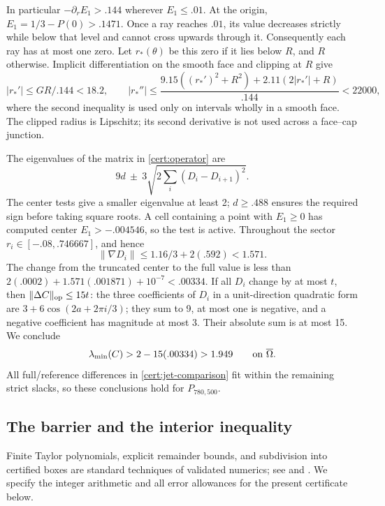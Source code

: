 \documentclass[11pt]{article}
\numberwithin{equation}{section}
\theoremstyle{definition}
\theoremstyle{remark}
\begin{document}
In particular $-\partial_rE_1>.144$ wherever $E_1\leq.01$.  At the origin,
$E_1=1/3-P(0)>.1471$.  Once a ray reaches $.01$, its value decreases
strictly while below that level and cannot cross upwards through it.
Consequently each ray has at most one zero.  Let $r_*(\theta)$ be this zero
if it lies below $R$, and $R$ otherwise.  Implicit differentiation on the
smooth face and clipping at $R$ give
\begin{equation}\label{cert:boundary-coarse}
 |r_*'|\leq GR/.144<18.2,\qquad
 |r_*''|\leq\frac{9.15((r_*')^2+R^2)+2.11(2|r_*'|+R)}{.144}<22000,
\end{equation}
where the second inequality is used only on intervals wholly in a smooth
face.  The clipped radius is Lipschitz; its second derivative is not used
across a face--cap junction.

The eigenvalues of the matrix in \eqref{cert:operator} are
\[
 9d\ \pm\ 3\sqrt{2\sum_i(D_i-D_{i+1})^2}.
\]
The center tests give a smaller eigenvalue at least 2; $d\geq.488$ ensures
the required sign before taking square roots.  A cell containing a point
with $E_1\geq0$ has computed center $E_1>-.004546$, so the test is active.
Throughout the sector $r_i\in[-.08,.746667]$, and hence
\[
 \|\nabla D_i\|\leq1.16/3+2(.592)<1.571.
\]
The change from the truncated center to the full value is less than
$2(.0002)+1.571(.001871)+10^{-7}<.00334$.  If all $D_i$ change by at most
$t$, then $\|\Delta C\|_{\rm op}\leq15t$: the three coefficients of $D_i$
in a unit-direction quadratic form are $3+6\cos(2a+2\pi i/3)$; they sum to
9, at most one is negative, and a negative coefficient has magnitude at
most 3.  Their absolute sum is at most 15.  We conclude
\begin{equation}\label{cert:ellipticity}
 \lambda_{\min}(C)>2-15(.00334)>1.949\qquad\hbox{on }\overline\Omega.
\end{equation}
All full/reference differences in \eqref{cert:jet-comparison} fit within
the remaining strict slacks, so these conclusions hold for $P_{780,500}$.

\subsection{The barrier and the interior inequality}
\label{cert:interior}

Finite Taylor polynomials, explicit remainder bounds, and subdivision
into certified boxes are standard techniques of validated numerics; see
\cite[Section~2 and Algorithm~1]{makinoberz2003} and
\cite[Section~2]{solovyevhales2013}.  We specify the integer
arithmetic and all error allowances for the present certificate below.
\end{document}
